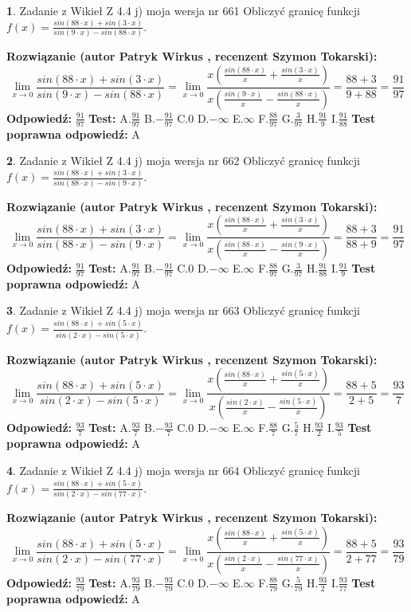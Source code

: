 \documentclass[12pt, a4paper]{article}
\theoremstyle{definition} %
\newtheorem{zad}{}
\newcommand{\zadStart}[1]{\begin{zad}#1\newline}
\newcommand{\zadStop}{\end{zad}}
\newcommand{\rozwStart}[2]{\noindent \textbf{Rozwiązanie (autor #1 , recenzent #2): }\newline}
\newcommand{\rozwStop}{\newline}
\newcommand{\odpStart}{\noindent \textbf{Odpowiedź:}\newline}
\newcommand{\odpStop}{\newline}
\newcommand{\testStart}{\noindent \textbf{Test:}\newline}
\newcommand{\testStop}{\newline}
\newcommand{\kluczStart}{\noindent \textbf{Test poprawna odpowiedź:}\newline}
\newcommand{\kluczStop}{\newline}
\begin{document}
\zadStart{Zadanie z Wikieł Z 4.4 j) moja wersja nr 661}
Obliczyć granicę funkcji $f(x)=\frac{sin(88\cdot x) +sin(3\cdot x)}{sin(9\cdot x) -sin(88\cdot x)}$.
\zadStop
\rozwStart{Patryk Wirkus}{Szymon Tokarski}
$$\lim\limits_{x\to 0}\frac{sin(88\cdot x) +sin(3\cdot x)}{sin(9\cdot x) -sin(88\cdot x)}=\lim\limits_{x\to 0}\frac{x(\frac{sin(88\cdot x)}{x}+\frac{sin(3\cdot x)}{x})}{x(\frac{sin(9\cdot x)}{x}-\frac{sin(88\cdot x)}{x})}=\frac{88+3}{9+88} = \frac{91}{97}$$
\rozwStop
\odpStart
$\frac{91}{97}$
\odpStop
\testStart
A.$\frac{91}{97}$
B.$-\frac{91}{97}$
C.$0$
D.$-\infty$
E.$\infty$
F.$\frac{88}{97}$
G.$\frac{3}{97}$
H.$\frac{91}{9}$
I.$\frac{91}{88}$
\testStop
\kluczStart
A
\kluczStop



\zadStart{Zadanie z Wikieł Z 4.4 j) moja wersja nr 662}
Obliczyć granicę funkcji $f(x)=\frac{sin(88\cdot x) +sin(3\cdot x)}{sin(88\cdot x) -sin(9\cdot x)}$.
\zadStop
\rozwStart{Patryk Wirkus}{Szymon Tokarski}
$$\lim\limits_{x\to 0}\frac{sin(88\cdot x) +sin(3\cdot x)}{sin(88\cdot x) -sin(9\cdot x)}=\lim\limits_{x\to 0}\frac{x(\frac{sin(88\cdot x)}{x}+\frac{sin(3\cdot x)}{x})}{x(\frac{sin(88\cdot x)}{x}-\frac{sin(9\cdot x)}{x})}=\frac{88+3}{88+9} = \frac{91}{97}$$
\rozwStop
\odpStart
$\frac{91}{97}$
\odpStop
\testStart
A.$\frac{91}{97}$
B.$-\frac{91}{97}$
C.$0$
D.$-\infty$
E.$\infty$
F.$\frac{88}{97}$
G.$\frac{3}{97}$
H.$\frac{91}{88}$
I.$\frac{91}{9}$
\testStop
\kluczStart
A
\kluczStop



\zadStart{Zadanie z Wikieł Z 4.4 j) moja wersja nr 663}
Obliczyć granicę funkcji $f(x)=\frac{sin(88\cdot x) +sin(5\cdot x)}{sin(2\cdot x) -sin(5\cdot x)}$.
\zadStop
\rozwStart{Patryk Wirkus}{Szymon Tokarski}
$$\lim\limits_{x\to 0}\frac{sin(88\cdot x) +sin(5\cdot x)}{sin(2\cdot x) -sin(5\cdot x)}=\lim\limits_{x\to 0}\frac{x(\frac{sin(88\cdot x)}{x}+\frac{sin(5\cdot x)}{x})}{x(\frac{sin(2\cdot x)}{x}-\frac{sin(5\cdot x)}{x})}=\frac{88+5}{2+5} = \frac{93}{7}$$
\rozwStop
\odpStart
$\frac{93}{7}$
\odpStop
\testStart
A.$\frac{93}{7}$
B.$-\frac{93}{7}$
C.$0$
D.$-\infty$
E.$\infty$
F.$\frac{88}{7}$
G.$\frac{5}{7}$
H.$\frac{93}{2}$
I.$\frac{93}{5}$
\testStop
\kluczStart
A
\kluczStop



\zadStart{Zadanie z Wikieł Z 4.4 j) moja wersja nr 664}
Obliczyć granicę funkcji $f(x)=\frac{sin(88\cdot x) +sin(5\cdot x)}{sin(2\cdot x) -sin(77\cdot x)}$.
\zadStop
\rozwStart{Patryk Wirkus}{Szymon Tokarski}
$$\lim\limits_{x\to 0}\frac{sin(88\cdot x) +sin(5\cdot x)}{sin(2\cdot x) -sin(77\cdot x)}=\lim\limits_{x\to 0}\frac{x(\frac{sin(88\cdot x)}{x}+\frac{sin(5\cdot x)}{x})}{x(\frac{sin(2\cdot x)}{x}-\frac{sin(77\cdot x)}{x})}=\frac{88+5}{2+77} = \frac{93}{79}$$
\rozwStop
\odpStart
$\frac{93}{79}$
\odpStop
\testStart
A.$\frac{93}{79}$
B.$-\frac{93}{79}$
C.$0$
D.$-\infty$
E.$\infty$
F.$\frac{88}{79}$
G.$\frac{5}{79}$
H.$\frac{93}{2}$
I.$\frac{93}{77}$
\testStop
\kluczStart
A
\kluczStop
\end{document}
